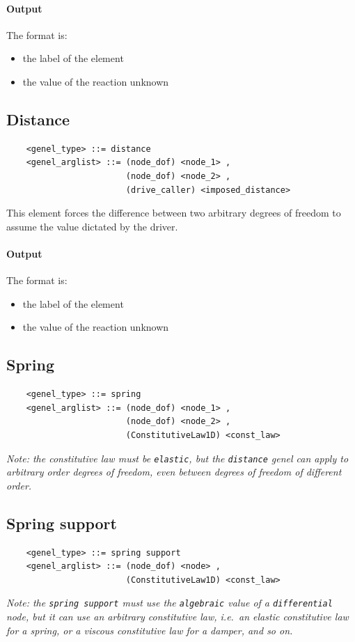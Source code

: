 \documentclass[10pt,dvips]{report}
\begin{document}
\paragraph{Output}
The format is:
\begin{itemize}
    \item the label of the element
    \item the value of the reaction unknown
\end{itemize}
  
\subsection{Distance}
\begin{verbatim}
    <genel_type> ::= distance
    <genel_arglist> ::= (node_dof) <node_1> ,
                        (node_dof) <node_2> ,
                        (drive_caller) <imposed_distance>
\end{verbatim}
This element forces the difference between two arbitrary degrees of freedom
to assume the value dictated by the driver.

\paragraph{Output}
The format is:
\begin{itemize}
    \item the label of the element
    \item the value of the reaction unknown
\end{itemize}
  
  
\subsection{Spring}
\begin{verbatim}
    <genel_type> ::= spring
    <genel_arglist> ::= (node_dof) <node_1> ,
                        (node_dof) <node_2> ,
                        (ConstitutiveLaw1D) <const_law>
\end{verbatim}
{\em 
    Note: the constitutive law must be {\tt elastic}, but the {\tt distance}
    genel can apply to arbitrary order degrees of freedom, even between degrees 
    of freedom of different order.
}

\subsection{Spring support}
\begin{verbatim}
    <genel_type> ::= spring support
    <genel_arglist> ::= (node_dof) <node> ,                      
                        (ConstitutiveLaw1D) <const_law>
\end{verbatim}
{\em
    Note: the {\tt spring support} must use the {\tt algebraic} value of a 
    {\tt differential} node, but it can use an arbitrary constitutive law,
    i.e.\ an elastic constitutive law for a spring, or a viscous
    constitutive law for a damper, and so on.
}
\end{document}
